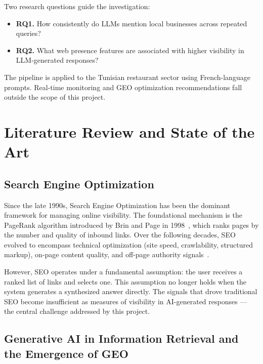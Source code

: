 Two research questions guide the investigation:

\begin{itemize}[label=\textbullet]
    \item \textbf{RQ1.} How consistently do LLMs mention local businesses across
    repeated queries?

    \item \textbf{RQ2.} What web presence features are associated with higher
    visibility in LLM-generated responses?
\end{itemize}

The pipeline is applied to the Tunisian restaurant sector using French-language
prompts. Real-time monitoring and GEO optimization recommendations fall outside
the scope of this project.

\section{Literature Review and State of the Art}

\subsection{Search Engine Optimization}

Since the late 1990s, Search Engine Optimization has been the dominant framework for
managing online visibility. The foundational mechanism is the PageRank algorithm
introduced by Brin and Page in 1998~\cite{brin1998anatomy}, which ranks pages by the
number and quality of inbound links. Over the following decades, SEO evolved to
encompass technical optimization (site speed, crawlability, structured markup),
on-page content quality, and off-page authority signals~\cite{moz2023seo}.

However, SEO operates under a fundamental assumption: the user receives a ranked list
of links and selects one. This assumption no longer holds when the system generates a
synthesized answer directly. The signals that drove traditional SEO become insufficient
as measures of visibility in AI-generated responses — the central challenge addressed
by this project.

\subsection{Generative AI in Information Retrieval and the Emergence of GEO}

